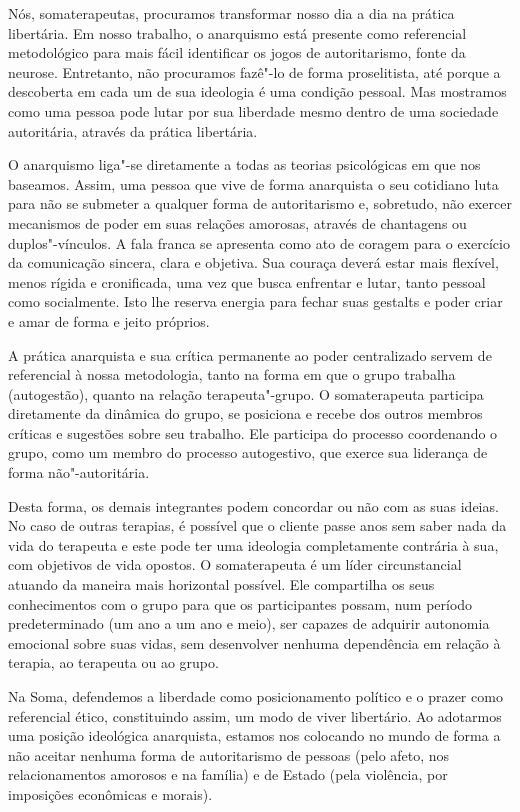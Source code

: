 Nós, somaterapeutas, procuramos transformar nosso dia a dia na prática
libertária. Em nosso trabalho, o anarquismo está presente como
referencial metodológico para mais fácil identificar os jogos de
autoritarismo, fonte da neurose. Entretanto, não procuramos fazê"-lo de
forma proselitista, até porque a descoberta em cada um de sua ideologia
é uma condição pessoal. Mas mostramos como uma pessoa pode lutar por sua
liberdade mesmo dentro de uma sociedade autoritária, através da prática
libertária.

O anarquismo liga"-se diretamente a todas as teorias psicológicas em que
nos baseamos. Assim, uma pessoa que vive de forma anarquista o seu
cotidiano luta para não se submeter a qualquer forma de autoritarismo e,
sobretudo, não exercer mecanismos de poder em suas relações amorosas,
através de chantagens ou duplos"-vínculos. A fala franca se apresenta
como ato de coragem para o exercício da comunicação sincera, clara e
objetiva. Sua couraça deverá estar mais flexível, menos rígida e
cronificada, uma vez que busca enfrentar e lutar, tanto pessoal como
socialmente. Isto lhe reserva energia para fechar suas gestalts e poder criar
e amar de forma e jeito próprios.

A prática anarquista e sua crítica permanente ao poder centralizado
servem de referencial à nossa metodologia, tanto na forma em que o grupo
trabalha (autogestão), quanto na relação terapeuta"-grupo. O
somaterapeuta participa diretamente da dinâmica do grupo, se posiciona e
recebe dos outros membros críticas e sugestões sobre seu trabalho. Ele
participa do processo coordenando o grupo, como um membro do processo
autogestivo, que exerce sua liderança de forma não"-autoritária.

Desta forma, os demais integrantes podem concordar ou não com as suas
ideias. No caso de outras terapias, é possível que o cliente passe anos
sem saber nada da vida do terapeuta e este pode ter uma ideologia
completamente contrária à sua, com objetivos de vida opostos. O
somaterapeuta é um líder circunstancial atuando da maneira mais
horizontal possível. Ele compartilha os seus conhecimentos com o grupo
para que os participantes possam, num período predeterminado (um ano a
um ano e meio), ser capazes de adquirir autonomia emocional sobre suas
vidas, sem desenvolver nenhuma dependência em relação à terapia, ao
terapeuta ou ao grupo.

Na Soma, defendemos a liberdade como posicionamento político e o prazer
como referencial ético, constituindo assim, um modo de viver libertário.
Ao adotarmos uma posição ideológica anarquista, estamos nos colocando no
mundo de forma a não aceitar nenhuma forma de autoritarismo de pessoas
(pelo afeto, nos relacionamentos amorosos e na família) e de Estado
(pela violência, por imposições econômicas e morais).

